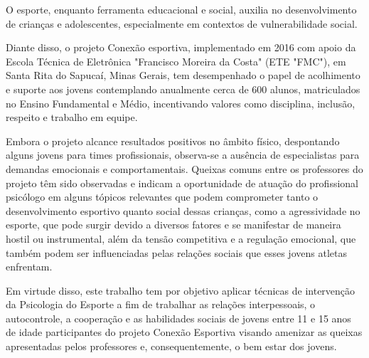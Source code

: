 \begin{Introducao} %
O esporte, enquanto ferramenta educacional e social, auxilia no desenvolvimento de crianças e adolescentes, especialmente em contextos de vulnerabilidade social. 

Diante disso, o projeto Conexão esportiva, implementado em 2016 com apoio da Escola Técnica de Eletrônica "Francisco Moreira da Costa" (ETE "FMC"), em Santa Rita do Sapucaí, Minas Gerais, tem desempenhado o papel de acolhimento e suporte aos jovens contemplando anualmente cerca de 600 alunos, matriculados no Ensino Fundamental e Médio, incentivando valores como disciplina, inclusão, respeito e trabalho em equipe.

Embora o projeto alcance resultados positivos no âmbito físico, despontando alguns jovens para times profissionais, observa-se a ausência de especialistas para demandas emocionais e comportamentais. Queixas comuns entre os professores do projeto têm sido observadas e indicam a oportunidade de atuação do profissional psicólogo em alguns tópicos relevantes que podem comprometer tanto o desenvolvimento esportivo quanto social dessas crianças, como a agressividade no esporte, que pode surgir devido a diversos fatores e se manifestar de maneira hostil ou instrumental, além da tensão competitiva e a regulação emocional, que também podem ser influenciadas pelas relações sociais que esses jovens atletas enfrentam.

Em virtude disso, este trabalho tem por objetivo aplicar técnicas de intervenção da Psicologia do Esporte a fim de trabalhar as relações interpessoais, o autocontrole, a cooperação e as habilidades sociais de jovens entre 11 e 15 anos de idade participantes do projeto Conexão Esportiva visando amenizar as queixas apresentadas pelos professores e, consequentemente, o bem estar dos jovens.
\end{Introducao}
